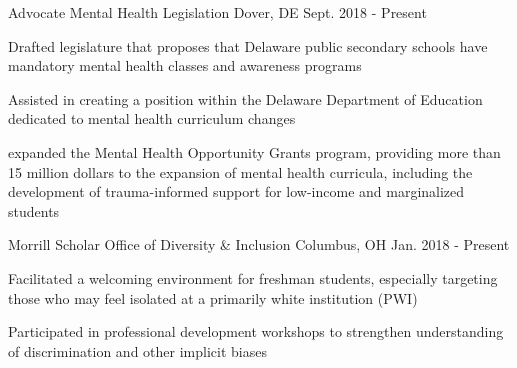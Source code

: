 \begin{cventries}
  \cventry
    {Advocate} %
    {Mental Health Legislation} %
    {Dover, DE} %
    {Sept. 2018 - Present} %
    {
      \begin{cvitems} %
        \item {Drafted legislature that proposes that Delaware public secondary schools have mandatory mental health classes and awareness programs}
        \item {Assisted in creating a position within the Delaware Department of Education dedicated to mental health
curriculum changes}
        \item{expanded the Mental Health Opportunity Grants program, providing more than 15 million dollars to the expansion of mental health curricula, including the development of trauma-informed support for low-income and marginalized students}
      \end{cvitems}
    }

  \cventry
    {Morrill Scholar} %
    {Office of Diversity \& Inclusion} %
    {Columbus, OH} %
    {Jan. 2018 - Present} %
    {
      \begin{cvitems} %
        \item {Facilitated a welcoming environment for freshman students, especially targeting those who may feel isolated at a primarily white institution (PWI)}
        \item {Participated in professional development workshops to strengthen understanding of discrimination and
other implicit biases}
      \end{cvitems}
    }
\end{cventries}
